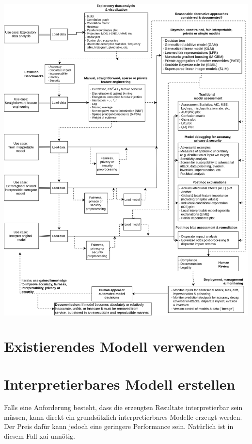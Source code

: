 \documentclass[
  12pt, %
  a4paper, %
  oneside, %
  openany, 
  numbers=noenddot, %
  BCOR=5mm, %
  parskip=half*, %
  thesis, %
]{bfhbook}
\begin{document}
\includegraphics[width=\textwidth]{Bilder/blueprint.png}

\section{Existierendes Modell verwenden}

\section{Interpretierbares Modell erstellen}

Falls eine Anforderung besteht, dass die erzeugten Resultate interpretierbar sein müssen, kann direkt ein grundsätzlich interpretierbares Modelle erzeugt werden. Der Preis dafür kann jedoch eine geringere Performance sein. Natürlich ist in diesem Fall \Gls{xai} unnötig.
\end{document}
